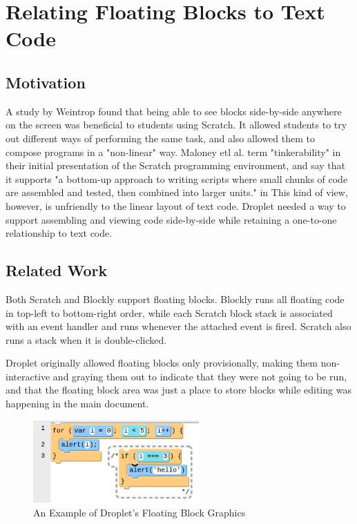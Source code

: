 \documentclass[conference]{IEEEtran}
\begin{document}
\section{Relating Floating Blocks to Text Code}

\subsection{Motivation}
A study by Weintrop \cite{Weintrop} found that being able to see blocks side-by-side anywhere on the screen was beneficial to students using Scratch. It allowed students to try out different ways of performing the same task, and also allowed them to compose programs in a "non-linear" way. Maloney etl al. \cite{Maloney} term "tinkerability" in their initial presentation of the Scratch programming environment, and say that it supports "a bottom-up approach to writing scripts where small chunks of code are assembled and tested, then combined into larger units." in This kind of view, however, is unfriendly to the linear layout of text code. Droplet needed a way to support assembling and viewing code side-by-side while retaining a one-to-one relationship to text code.

\subsection{Related Work}
Both Scratch and Blockly support floating blocks. Blockly runs all floating code in top-left to bottom-right order, while each Scratch block stack is associated with an event handler and runs whenever the attached event is fired. Scratch also runs a stack when it is double-clicked.

Droplet originally allowed floating blocks only provisionally, making them non-interactive and graying them out to indicate that they were not going to be run, and that the floating block area was just a place to store blocks while editing was happening in the main document.

\begin{figure}
\centering
\includegraphics[width=2.5in]{floating-image.png}
\caption{An Example of Droplet's Floating Block Graphics}
\label{floating}
\end{figure}
\end{document}
